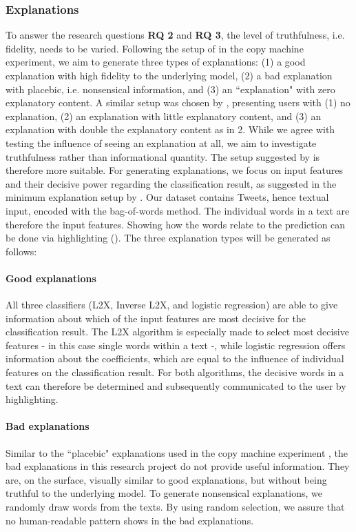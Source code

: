 \subsubsection{Explanations}
\label{subsubsec:method_explanations}
To answer the research questions \textbf{RQ 2} and \textbf{RQ 3}, the level of truthfulness, i.e. fidelity, needs to be varied. Following the setup of \cite{langer1978mindlessness} in the copy machine experiment, we aim to generate three types of explanations: (1) a good explanation with high fidelity to the underlying model, (2) a bad explanation with placebic, i.e. nonsensical information, and (3) an ``explanation" with zero explanatory content. A similar setup was chosen by \cite{ribeiro2018anchors}, presenting users with (1) no explanation, (2) an explanation with little explanatory content, and (3) an explanation with double the explanatory content as in 2. While we agree with testing the influence of seeing an explanation at all, we aim to investigate truthfulness rather than informational quantity. The setup suggested by \cite{langer1978mindlessness} is therefore more suitable.\newline
For generating explanations, we focus on input features and their decisive power regarding the classification result, as suggested in the minimum explanation setup by \cite{goodman16eu}. Our dataset contains Tweets, hence textual input, encoded with the bag-of-words method. The individual words in a text are therefore the input features. Showing how the words relate to the prediction can be done via highlighting (\cite{arras2017relevant, chen2012detecting, feng2018pathologies}).\newline
The three explanation types will be generated as follows:
\paragraph{Good explanations}
All three classifiers (L2X, Inverse L2X, and logistic regression) are able to give information about which of the input features are most decisive for the classification result. The L2X algorithm is especially made to select most decisive features - in this case single words within a text -, while logistic regression offers information about the coefficients, which are equal to the influence of individual features on the classification result. For both algorithms, the decisive words in a text can therefore be determined and subsequently communicated to the user by highlighting.
\paragraph{Bad explanations}
Similar to the ``placebic" explanations used in the copy machine experiment \cite{langer1978mindlessness}, the bad explanations in this research project do not provide useful information. They are, on the surface, visually similar to good explanations, but without being truthful to the underlying model. To generate nonsensical explanations, we randomly draw words from the texts. By using random selection, we assure that no human-readable pattern shows in the bad explanations.
